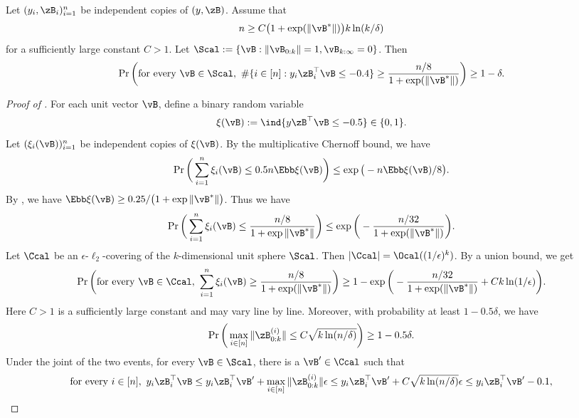\documentclass[11pt]{article}
\begin{document}
\begin{lemma}\label{lemma:zero-one:const-frac-failure-prob}
Let $(y_i,\zB_i)_{i=1}^n$ be independent copies of $(y,\zB)$. Assume that 
\begin{align*}
    n \ge C \big( 1+\exp(\|\vB^*\|)\big)  k  \ln(k /\delta)
\end{align*} 
for a sufficiently large constant $C>1$.
Let $\Scal:= \{\vB: \|\vB_{0:k}\|=1, \vB_{k:\infty}=0\}$.
Then \begin{align*}
    \Pr\bigg( \text{for every $\vB\in \Scal$},\ \#\{i\in[n]: y_i \zB_i^\top \vB \le -0.4 \}  \ge \frac{n/8}{1+\exp(\|\vB^*\|)} \bigg) \ge 1-\delta.
\end{align*}
\end{lemma}
\begin{proof}[Proof of ]
For each unit vector $\vB$, define a binary random variable 
\[
\xi(\vB) := \ind{y \zB^\top \vB \le - 0.5} \in \{0, 1\}.
\]
Let $(\xi_i(\vB))_{i=1}^n$ be independent copies of $\xi(\vB)$. By the multiplicative Chernoff bound, we have 
\begin{align*}
    \Pr \bigg(\sum_{i=1}^n \xi_i(\vB) \le  0.5 n  \Ebb \xi(\vB) \bigg) \le \exp\big(- n  \Ebb \xi(\vB) / 8 \big).
\end{align*}
By , we have 
$\Ebb \xi(\vB)  \ge 0.25 / \big(1+\exp{\|\vB^*\|}\big)$.
Thus we have 
\begin{align*}
    \Pr \bigg(\sum_{i=1}^n \xi_i(\vB) \le  \frac{n/8}{1+\exp{\|\vB^*\|}}\bigg) 
    \le \exp\bigg(-  \frac{n/32}{1+\exp(\|\vB^*\|)} \bigg).
\end{align*}
Let $\Ccal$ be an $\epsilon$-$\ell_2$-covering of the $k$-dimensional unit sphere $\Scal$. Then $|\Ccal|=\Ocal((1/\epsilon)^k)$. 
By a union bound, we get 
\begin{align*}
  \Pr\bigg( \text{for every $\vB\in\Ccal$},\  \sum_{i=1}^n \xi_i(\vB) \ge \frac{n/8}{1+\exp(\|\vB^*\|)} \bigg) \ge 1- \exp\bigg(- \frac{n/32}{1+\exp(\|\vB^*\|)} + C k \ln(1/\epsilon)\bigg).
\end{align*}
Here $C>1$ is a sufficiently large constant and may vary line by line.
Moreover, with probability at least $1- 0.5 \delta$, we have 
\[
\Pr\bigg(  \max_{i\in[n]}\|\zB^{(i)}_{0:k}\| \le  C \sqrt{k\ln(n/\delta)} \bigg) \ge 1-0.5\delta.\]
Under the joint of the two events, for every $\vB\in\Scal$, there is a $\vB'\in\Ccal$ such that
\begin{align*}
\text{for every $i\in[n]$},\  y_i\zB_i^\top \vB \le y_i\zB_i^\top \vB' + \max_{i\in[n]}\|\zB^{(i)}_{0:k}\| \epsilon \le y_i\zB_i^\top \vB' + C \sqrt{k\ln(n/\delta)} \epsilon \le y_i\zB_i^\top \vB' - 0.1,

\end{align*}
\end{proof}
\end{document}
